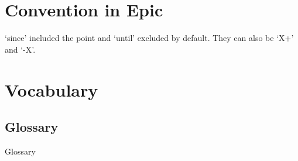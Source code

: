 \section{Convention in Epic}

`since' included the point and `until' excluded by default. They can also be `X+' and `-X'.

\section{Vocabulary}
\subsection{Glossary}
{Glossary}

